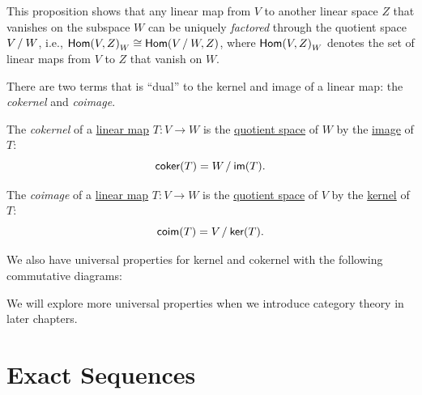 This proposition shows that any linear map from $V$ to another linear space $Z$ that vanishes on the subspace $W$ can be uniquely \emph{factored} through the quotient space $V \mathbin{/} W$, i.e., ${\operatorname{\text{\normalfont\sffamily Hom}}(V, Z)}_W \cong \operatorname{\text{\normalfont\sffamily Hom}}(V \mathbin{/} W, Z)$, where ${\operatorname{\text{\normalfont\sffamily Hom}}(V, Z)}_W$ denotes the set of linear maps from $V$ to $Z$ that vanish on $W$.

There are two terms that is ``dual'' to the kernel and image of a linear map: the \emph{cokernel} and \emph{coimage}.

\begin{definition}[Cokernel]\label{def:cokernel}
  The \emph{cokernel} of a \hyperref[def:linear_map]{linear map} $T \colon V \to W$ is the \hyperref[def:quotient_space]{quotient space} of $W$ by the \hyperref[def:image]{image} of $T$:
  \[
    \operatorname{\text{\normalfont\sffamily coker}}(T) = W \mathbin{/} \operatorname{\text{\normalfont\sffamily im}}(T).
  \]
\end{definition}

\begin{definition}[Coimage]\label{def:coimage}
  The \emph{coimage} of a \hyperref[def:linear_map]{linear map} $T \colon V \to W$ is the \hyperref[def:quotient_space]{quotient space} of $V$ by the \hyperref[def:kernel]{kernel} of $T$:
  \[
    \operatorname{\text{\normalfont\sffamily coim}}(T) = V \mathbin{/} \operatorname{\text{\normalfont\sffamily ker}}(T).
  \]
\end{definition}

We also have universal properties for kernel and cokernel with the following commutative diagrams:
\begin{center}
\end{center}

We will explore more universal properties when we introduce category theory in later chapters.

\section{Exact Sequences}

